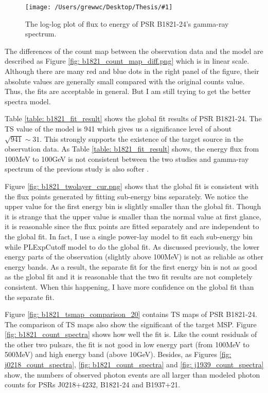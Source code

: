 \documentclass[12pt]{report}
\newcommand{\singleFig}[3]{
  \begin{figure}[!htp]
    \centering
    \texttt{[image: /Users/grewwc/Desktop/Thesis/\#1]}
    \caption{#3}
    \label{fig: #1}
  \end{figure}
}
\begin{document}
            \singleFig{b1821_cur.png}{0.37}{The log-log plot of flux to energy of 
              PSR B1821-24's gamma-ray spectrum.}
            \vspace{1cm}

            The differences of the count map between the observation data and the model are described 
            as Figure \ref{fig: b1821_count_map_diff.png} which is in linear scale. Although there are 
            many red and blue dots in the right panel of the figure, their absolute values are 
            generally small compared with the original counts value.
            Thus, the fits are acceptable in general. But I am still trying to get the better spectra 
            model. 

            Table \ref{table: b1821_fit_result} shows the global fit results of PSR B1821-24. 
            The TS value of the model is 941 which gives us a significance level 
            of about $\sqrt{941} \sim 31$. This strongly supports the existence of the target source in 
            the observation data. As Table \ref{table: b1821_fit_result} shows, the energy flux from 
            100MeV to 100GeV is not consistent between the two studies and gamma-ray spectrum of the 
            previous study is also softer \cite{2013ApJ...778..106J}. 

            Figure \ref{fig: b1821_twolayer_cur.png} shows that the global fit is consistent with 
            the flux points generated by fitting sub-energy bins separately. We notice the upper value 
            for the first energy bin is slightly smaller than the global fit. 
            Though it is strange that the upper value is smaller than the normal value at first glance, 
            it is reasonable since the flux points are fitted separately and are independent to 
            the global fit. In fact, I use a single power-lay model to fit each sub-energy bin while 
            PLExpCutoff model to do the global fit. As discussed previously, the lower energy parts of 
            the observation (slightly above 100MeV) is not as reliable as other energy bands. As a result, the 
            separate fit for the first energy bin is not as good as the global fit and it is reasonable 
            that the two fit results are not completely consistent. When this happening, I have 
            more confidence on the global fit than the separate fit.
            
            Figure \ref{fig: b1821_tsmap_comparison_20} contains TS maps of PSR B1821-24. The 
            comparison of TS maps also show the significant of the target MSP. Figure 
            \ref{fig: b1821_count_spectra} shows how well the fit is. Like the count residuals of 
            the other two pulsars, the fit is not good in low energy part (from 100MeV to 500MeV)
            and high energy band (above 10GeV). Besides, as Figures \ref{fig: j0218_count_spectra},
            \ref{fig: b1821_count_spectra} and \ref{fig: j1939_count_spectra} show, the numbers of 
            observed photon events are all larger than modeled photon counts for PSRs J0218+4232, 
            B1821-24 and B1937+21. 
\end{document}
